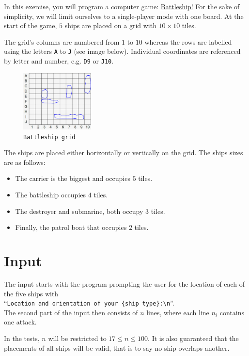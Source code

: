 
In this exercise, you will program a computer game:
\href{https://en.wikipedia.org/wiki/Battleship_(game)}{Battleship!}
For the sake of simplicity, we will limit ourselves to a single-player mode with one board.
At the start of the game, $5$ ships are placed on a grid with $10 \times 10$ tiles.

The grid's columns are numbered from $1$ to $10$
whereas the rows are labelled using the letters \texttt{A} to \texttt{J} (see image below).
Individual coordinates are referenced by letter and number, e.g. \texttt{D9} or \texttt{J10}.

\begin{figure}[h]
    \centering
    \includegraphics[width=0.33\textwidth]{battleship-grid}
    \caption{\texttt{Battleship grid}}
\end{figure}
The ships are placed either horizontally or vertically on the grid.
The ships sizes are as follows:
\begin{itemize}
    \item The carrier is the biggest and occupies $5$ tiles.
    \item The battleship occupies $4$ tiles.
    \item The destroyer and submarine, both occupy $3$ tiles.
    \item Finally, the patrol boat that occupies $2$ tiles.
\end{itemize}

\section*{Input}
The input starts with the program prompting the user for the location of each of the five ships with\\
``\texttt{Location and orientation of your \{ship type\}:\textbackslash n}''.\\
The second part of the input then consists of $n$ lines, 
where each line $n_i$ contains one attack.

In the tests, $n$ will be restricted to $17 \le n \le 100$.
It is also guaranteed that the placements of all ships will be valid, 
that is to say no ship overlaps another.

